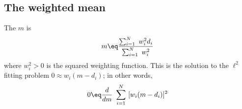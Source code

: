\subsection{The weighted mean}
The  $m$ is
\begin{equation}
m \eq
\frac{\sum_{i=1}^N \ w_i^2 d_i  }{ \sum_{i=1}^N \ w_i^2 }
\end{equation}
where $w_i^2>0$ is the squared weighting function.
This is the solution to the $\ell^2$ fitting problem
$ 0  \approx w_i (m - d_i)$;
in other words,
\begin{equation}
0 \eq \frac{d }{ dm} \ \sum_{i=1}^N \ [w_i(m - d_i)]^2
\end{equation}

\begin{comment}
\subsection{Weighted L.S. conjugate-direction template}
The pseudocode for minimizing the {\it weighted} residual
$\bold 0\approx \bold r = \bold W (\bold F \bold m - \bold d)$
by conjugate-direction method,
is effectively like that for the unweighted method
except that the initial residual is weighted
and the operator $\bold F$ has the premultiplier $\bold W$.
Naturally, the adjoint operator $\bold F'$
has the postmultiplier $\bold W'$.
In some applications the weighting operator $\bold W$
is simply a weighting function or diagonal matrix
(so then $\bold W = \bold W'$)
and in other applications, the weighting operator $\bold W$
may be an operator,
like the derivative along a data recording trajectory
(so then $\bold W \ne \bold W'$).
\def\padarrow{\quad\longleftarrow\quad}
\begin{tabbing}
mmmmmm \= mmmmmm \= mmmmm \kill
\> $\bold r \padarrow \bold W (\bold F \bold m - \bold d)$     \\
\> {\rm iterate \{ }                                            \\
\>      \>  $\Delta\bold m  \padarrow \bold F'\bold W'\         \bold r$ \\
\>      \>  $\Delta\bold r\ \padarrow \bold W \bold F \  \Delta \bold m$ \\
\>      \>  $(\bold m,\bold r) \padarrow {\rm cgstep}
            (\bold m,\bold r, \Delta\bold m,\Delta\bold r )$ \\
\>      \> \}                                           
\end{tabbing}


\end{comment}
